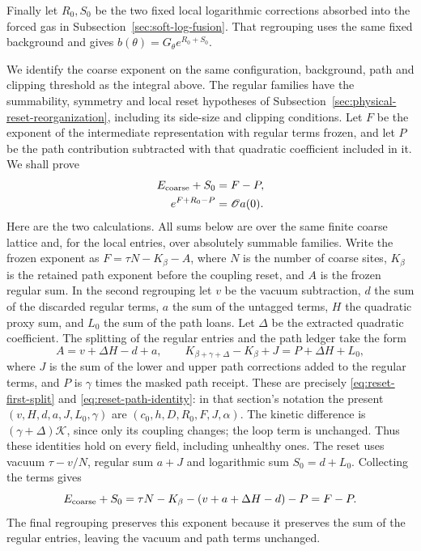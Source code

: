 Finally let $R_0,S_0$ be the two fixed local logarithmic corrections
absorbed into the forced gas in Subsection~\ref{sec:soft-log-fusion}.
That regrouping uses the same fixed background and gives
$b(\theta)=G_\theta e^{R_0+S_0}$.

We identify the coarse exponent on the same configuration, background,
path and clipping threshold as the integral above. The regular
families have the summability, symmetry and local reset hypotheses of
Subsection~\ref{sec:physical-reset-reorganization}, including its side-size
and clipping conditions. Let $F$ be the exponent
of the intermediate representation with regular terms frozen, and
let $P$ be the path contribution subtracted with that quadratic
coefficient included in it. We shall prove
\begin{align}
 E_{\rm coarse}+S_0&=F-P,\label{eq:marked-output-exponent-input}\\
 e^{F+R_0-P}&=\mathscr O a(0).\label{eq:marked-regular-accounting-input}
\end{align}
Here are the two calculations. All sums below are over the same
finite coarse lattice and, for the local entries, over absolutely
summable families. Write the frozen exponent as
$F=\tau N-K_\beta-A$, where $N$ is the number of coarse sites,
$K_\beta$ is the retained path exponent before the coupling reset,
and $A$ is the frozen regular sum. In the second regrouping let $v$
be the vacuum subtraction, $d$ the sum of the discarded regular
terms, $a$ the sum of the untagged terms, $H$ the quadratic proxy
sum, and $L_0$ the sum of the path loans. Let $\Delta$ be the
extracted quadratic coefficient. The splitting of the regular
entries and the path ledger take the form
\[
 A=v+\Delta H-d+a,\qquad
 K_{\beta+\gamma+\Delta}-K_\beta+J=P+\Delta H+L_0,
\]
where $J$ is the sum of the lower and upper path corrections added
to the regular terms, and $P$ is $\gamma$ times the masked path
receipt. These are precisely \eqref{eq:reset-first-split} and
\eqref{eq:reset-path-identity}: in that section's notation the present
$(v,H,d,a,J,L_0,\gamma)$ are $(c_0,h,D,R_0,F,J,\alpha)$.
The kinetic difference is $(\gamma+\Delta)\mathcal K$, since only
its coupling changes; the loop term is unchanged. Thus these identities
hold on every field, including unhealthy ones.
The reset uses vacuum $\tau-v/N$, regular sum $a+J$
and logarithmic sum $S_0=d+L_0$. Collecting the terms gives
\[
 E_{\rm coarse}+S_0
 =\tau N-K_\beta-(v+a+\Delta H-d)-P=F-P.
\]
The final regrouping preserves this exponent because it preserves
the sum of the regular entries, leaving the vacuum and path terms
unchanged.

